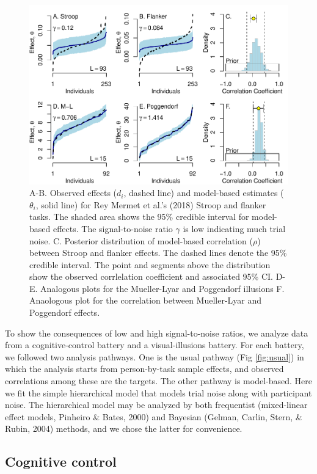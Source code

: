 \documentclass[
  ,man]{apa6}
\begin{document}
\begin{figure}
\centering
\includegraphics{p_files/figure-latex/reg-1.pdf}
\caption{\label{fig:reg}A-B. Observed effects (\(d_i\), dashed line) and model-based estimates (\(\theta_i\), solid line) for Rey Mermet et al.'s (2018) Stroop and flanker tasks. The shaded area shows the 95\% credible interval for model-based effects. The signal-to-noise ratio \(\gamma\) is low indicating much trial noise. C. Posterior distribution of model-based correlation (\(\rho\)) between Stroop and flanker effects. The dashed lines denote the 95\% credible interval. The point and segments above the distribution show the observed corrlelation coefficient and associated 95\% CI. D-E. Analogous plots for the Mueller-Lyar and Poggendorf illusions F. Anaologous plot for the correlation between Mueller-Lyar and Poggendorf effects.}
\end{figure}

To show the consequences of low and high signal-to-noise ratios, we analyze data from a cognitive-control battery and a visual-illusions battery. For each battery, we followed two analysis pathways. One is the usual pathway (Fig \ref{fig:usual}) in which the analysis starts from person-by-task sample effects, and observed correlations among these are the targets. The other pathway is model-based. Here we fit the simple hierarchical model that models trial noise along with participant noise. The hierarchical model may be analyzed by both frequentist (mixed-linear effect models, Pinheiro \& Bates, 2000) and Bayesian (Gelman, Carlin, Stern, \& Rubin, 2004) methods, and we chose the latter for convenience.

\hypertarget{cognitive-control}{%
\subsection{Cognitive control}\label{cognitive-control}}
\end{document}
